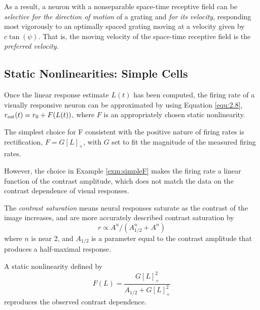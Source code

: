 \begin{rem}
  As a result, a neuron with a nonseparable space-time receptive field can be \emph{selective for the direction of motion} of a grating and \emph{for its velocity}, responding most vigorously to an optimally spaced grating moving at a velocity given by $c\tan(\psi)$. That is, the moving velocity of the space-time receptive field is the \emph{preferred velocity}.
\end{rem}

\subsection{Static Nonlinearities: Simple Cells}
\label{sec:StaticNonlinearitiesForSimpleCells}

\begin{rem}
  Once the linear response estimate $L(t)$ has been computed, the firing rate of a visually responsive neuron can be approximated by using Equation \ref{equ:2.8}, $r_{\rm{est}}(t) = r_0 +F(L(t))$, where $F$ is an  appropriately chosen static nonlinearity.
\end{rem}

\begin{exm}
  \label{exm:simpleF}
  The simplest choice for F consistent with the positive nature of firing rates is rectification, $F = G[L]_+$, with $G$ set to fit the magnitude of the measured firing rates.
\end{exm}

\begin{rem}
  However, the choice in Example \ref{exm:simpleF} makes the firing rate a linear function of the contrast amplitude, which does not match the data on the contrast dependence of visual responses.
\end{rem}

\begin{defn}
  \label{defn:contrastSaturation}
  The \emph{contrast saturation} means neural responses saturate as the contrast of the image increases, and are more accurately described contrast saturation by
  \begin{displaymath}
    r \propto A^n/(A_{1/2}^n + A^n)
  \end{displaymath}
  where $n$ is near 2, and $A_{1/2}$ is a parameter equal to the contrast amplitude that produces a half-maximal response.
\end{defn}

\begin{prop}
  A static nonlinearity defined by
  \begin{equation}
    \label{equ:2.38}
    F(L) = \frac{G[L]_+^2}{A_{1/2}+G[L]_+^2}
  \end{equation}
  reproduces the observed contrast dependence.
\end{prop}




